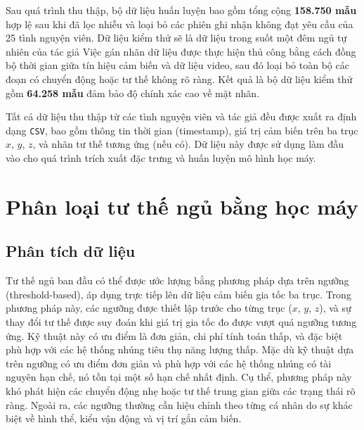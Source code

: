 Sau quá trình thu thập, bộ dữ liệu huấn luyện bao gồm tổng cộng \textbf{158.750 mẫu} 
hợp lệ sau khi đã lọc nhiễu và loại bỏ các phiên ghi nhận không đạt yêu cầu của 25 tình nguyện viên. 
Dữ liệu kiểm thử sẽ là dữ liệu trong suốt một đêm ngủ tự nhiên của tác giả 
Việc gán nhãn dữ liệu được thực hiện thủ công bằng cách đồng bộ thời gian giữa 
tín hiệu cảm biến và dữ liệu video, sau đó loại bỏ toàn bộ các đoạn có chuyển động 
hoặc tư thế không rõ ràng. Kết quả là bộ dữ liệu kiểm thử gồm \textbf{64.258 mẫu} 
đảm bảo độ chính xác cao về mặt nhãn.

Tất cả dữ liệu thu thập từ các tình nguyện viên và tác giả đều được xuất ra định 
dạng \texttt{CSV}, bao gồm thông tin thời gian (timestamp), 
giá trị cảm biến trên ba trục $x$, $y$, $z$, và nhãn tư thế tương ứng 
(nếu có). Dữ liệu này được sử dụng làm đầu vào cho quá trình trích 
xuất đặc trưng và huấn luyện mô hình học máy.


\section{Phân loại tư thế ngủ bằng học máy}

\subsection{Phân tích dữ liệu}
Tư thế ngủ ban đầu có thể được ước lượng bằng phương pháp dựa trên ngưỡng 
(threshold-based), áp dụng trực tiếp lên dữ liệu cảm biến gia tốc ba 
trục. Trong phương pháp này, các ngưỡng được thiết lập trước cho từng 
trục ($x$, $y$, $z$), và sự thay đổi tư thế được suy đoán khi giá trị 
gia tốc đo được vượt quá ngưỡng tương ứng. Kỹ thuật này có ưu điểm là 
đơn giản, chi phí tính toán thấp, và đặc biệt phù hợp với các hệ thống 
nhúng tiêu thụ năng lượng thấp. 
Mặc dù kỹ thuật dựa trên ngưỡng có ưu điểm đơn giản và phù hợp với 
các hệ thống nhúng có tài nguyên hạn chế, nó tồn tại một số hạn chế 
nhất định. Cụ thể, phương pháp này khó phát hiện các chuyển động nhẹ 
hoặc tư thế trung gian giữa các trạng thái rõ ràng. Ngoài ra, các 
ngưỡng thường cần hiệu chỉnh theo từng cá nhân do sự khác biệt về 
hình thể, kiểu vận động và vị trí gắn cảm biến.


